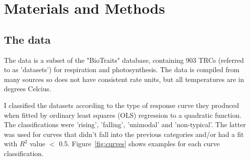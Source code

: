 \documentclass[11pt, a4paper]{article}
\begin{document}

	
	
	
		
\section{Materials and Methods}
	
	\subsection{The data}
	The data is a subset of the "BioTraits" database, containing 903 TRCs (referred to as 'datasets') for respiration and photosynthesis. The data is compiled from many sources so does not have consistent rate units, but all temperatures are in degrees Celcius.

	
	I classified the datasets according to the type of response curve they produced when fitted by ordinary least squares (OLS) regression to a quadratic function. The classifications were 'rising', 'falling', 'unimodal' and 'non-typical'. The latter was used for curves that didn't fall into the previous categories and/or had a fit with $R^2$ value $<$ 0.5. Figure~\ref{fig:curves} shows examples for each curve classification.
	
\end{document}
